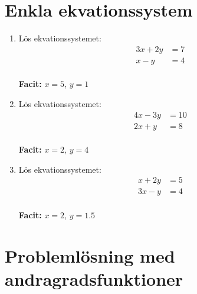 \documentclass[a4paper,11pt]{article}
\begin{document}
\section{Enkla ekvationssystem}

\begin{enumerate}[label=\textbf{\arabic*.}]
    \item Lös ekvationssystemet:
    \begin{align*}
    3x + 2y &= 7\\
    x - y &= 4
    \end{align*}
    \\ \textbf{Facit:} $x=5$, $y=1$
    
    \item Lös ekvationssystemet:
    \begin{align*}
    4x - 3y &= 10\\
    2x + y &= 8
    \end{align*}
    \\ \textbf{Facit:} $x=2$, $y=4$
    
    \item Lös ekvationssystemet:
    \begin{align*}
    x + 2y &= 5\\
    3x - y &= 4
    \end{align*}
    \\ \textbf{Facit:} $x=2$, $y=1.5$
\end{enumerate}

\section{Problemlösning med andragradsfunktioner}
\end{document}
